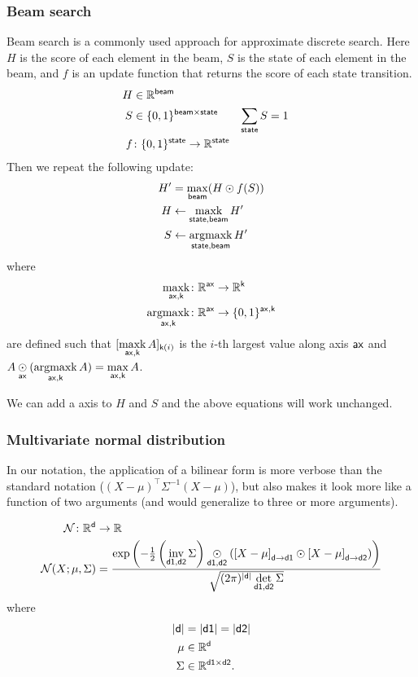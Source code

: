 \documentclass{article}
\newcommand{\reals}{\mathbb{R}}
\begin{document}
\subsubsection{Beam search}

Beam search is a commonly used approach for approximate discrete search. Here $H$ is the score of each element in the beam, $S$ is the state of each element in the beam, and $f$ is an update function that returns the score of each state transition. 
\begin{align*} 
H &\in \reals^{\name{beam}} \\
S &\in \{0, 1\}^{\name{beam} \times \name{state}} & \nsum{state} S &= 1 \\
f &\colon \{0, 1\}^{\name{state}} \rightarrow \reals^{\name{state}} \\
\end{align*}
Then we repeat the following update:
\begin{align*}
H' &= \mathop{\underset{\mathsf{beam}}{\mathrm{max}}} (H \odot f(S)) \\
H &\leftarrow \mathop{\underset{\mathsf{state,beam}}{\mathrm{maxk}}} H' \\
S &\leftarrow \mathop{\underset{\mathsf{state,beam}}{\mathrm{argmaxk}}} H'
\end{align*}
where
\begin{align*}
\nfun{ax,k}{maxk} \colon \reals^{\name{ax}} &\rightarrow \reals^{\name{k}} \\
\nfun{ax,k}{argmaxk} \colon \reals^{\name{ax}} &\rightarrow \{0,1\}^{\name{ax},\name{k}}
\end{align*}
are defined such that $[\mathop{\underset{\mathsf{ax,k}}{\mathrm{maxk}}} A]_{\mathsf{k}(i)}$ is the $i$-th largest value along axis $\mathsf{ax}$ and $A \mathbin{\underset{\mathsf{ax}}{\odot}} (\mathop{\underset{\mathsf{ax,k}}{\mathrm{argmaxk}}}{A}) = \mathop{\underset{\mathsf{ax,k}}{\mathrm{max}}} A$.

We can add a  axis to $H$ and $S$ and the above equations will work unchanged.

\subsubsection{Multivariate normal distribution}

In our notation, the application of a bilinear form is more verbose than the standard notation ($(X-\mu)^\top \Sigma^{-1} (X-\mu)$), but also makes it look more like a function of two arguments (and would generalize to three or more arguments).

\begin{align*}
\mathcal{N} \colon \reals^{\name{d}} &\rightarrow \reals \\
\mathcal{N}(X; \mu, \Sigma) &= \frac{\exp\left(-\frac{1}{2} \left(\nfun{d1, d2}{inv} \Sigma\right) \ndot{d1,d2} \left(\nmov{d}{d1}{X - \mu} \odot \nmov{d}{d2}{X - \mu} \right) \right)}{\sqrt{(2 \pi)^{|\name{d}|} \nfun{d1, d2}{det} \Sigma}}
\end{align*}
where
\begin{align*}
|\name{d}| &= |\name{d1}| = |\name{d2}| \\
\mu &\in \reals^{\name{d}} \\
\Sigma & \in \reals^{\name{d1} \times \name{d2}}.
\end{align*}
\end{document}

